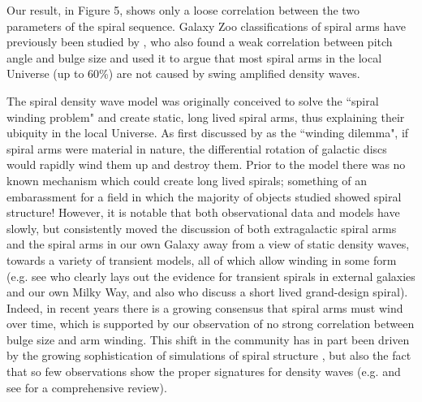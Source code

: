 \documentclass[usenatbib]{mn2e}
\begin{document}
 Our result, in Figure 5, shows only a loose correlation between the two parameters of the spiral sequence. Galaxy Zoo classifications of spiral arms have previously been studied by \citet{Hart2017b,Hart2018}, who also found a weak correlation between pitch angle and bulge size and used it to argue that most spiral arms in the local Universe (up to 60\%) are not caused by swing amplified density waves.  %

% 



The spiral density wave model \citep{LinShu1964} was originally conceived to solve the ``spiral winding problem" and create static, long lived spiral arms, thus explaining their ubiquity in the local Universe. As first discussed by \citet{Oort1962} as the ``winding dilemma", if spiral arms were material in nature, the differential rotation of galactic discs would rapidly wind them up and destroy them. Prior to the \citet{LinShu1964} model there was no known mechanism which could create long lived spirals; something of an embarassment for a field in which the majority of objects studied showed spiral structure! However, it is notable that both observational data and models have slowly, but consistently moved the discussion of both extragalactic spiral arms \citep{2013ApJ...766...34D} and the spiral arms in our own Galaxy \citep{hunt2018} away from a view of static density waves, towards a variety of transient models, all of which allow winding in some form (e.g. see \citealt{Sellwood2011} who clearly lays out the evidence for transient spirals in external galaxies and our own Milky Way, and also \citealt{Merrifield2006} who discuss a short lived grand-design spiral). Indeed, in recent years there is a growing consensus that spiral arms must wind over time, which is supported by our observation of no strong correlation between bulge size and arm winding. This shift in the community has in part been driven by the growing sophistication of simulations of spiral structure \citep[e.g.][]{Grand2013,Grand2017,Forgan2018,PettittWadsley2018}, but also the fact that so few observations show the proper signatures for density waves (e.g. \citealt{Merrifield2006,hunt2018} and see \citealt{Sellwood2011} for a comprehensive review).
\end{document}

